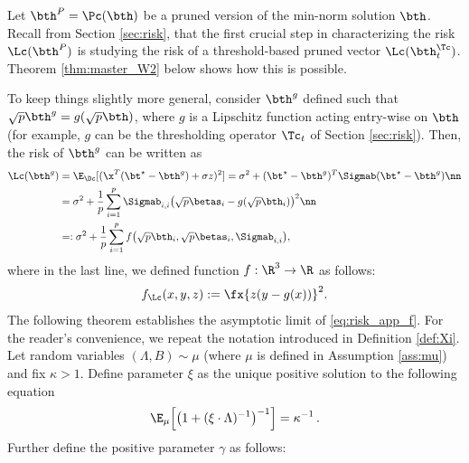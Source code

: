  Let $\bth^P=\Pc(\bth)$ be a pruned version of the min-norm solution $\bth$. Recall from Section \ref{sec:risk}, that the first crucial step in characterizing the risk $\Lc(\bth^P)$ is studying the risk of a threshold-based pruned vector $\Lc(\bth^\Tc_t)$. Theorem \ref{thm:master_W2} below shows how this is possible. 

To keep things slightly more general,  consider $\bth^{g}$ defined such that $\sqrt{p}\bth^{g}=g(\sqrt{p}\bth)$, where $g$ is a Lipschitz function acting entry-wise on $\bth$ (for example, $g$ can be the  thresholding operator $\Tc_t$ of Section \ref{sec:risk}). Then,  the risk of $\bth^g$ can be written as
\begin{align}
\Lc(\bth^g) &= \E_{\Dc}[(\x^T(\bt^\star-\bth^g) + \sigma z)^2] = \sigma^2 + (\bt^\star-\bth^g)^T\Sigmab(\bt^\star-\bth^g) \nn \\
  &= \sigma^2 + \frac{1}{p}\sum_{i=1}^p\Sigmab_{i,i}\big(\sqrt{p}\betas_i-g(\sqrt{p}\bth_i)\big)^2\nn
  \\
    &=: \sigma^2 + \frac{1}{p}\sum_{i=1}^p f\big(\sqrt{p}\bth_i,\sqrt{p}\betas_i,\Sigmab_{i,i}\big),\label{eq:risk_app_f}
\end{align}
where in the last line, we defined function $f:\R^3\rightarrow\R$ as follows:
\begin{align}\label{eq:fdef}
f_\Lc(x,y,z) := \fx{z(y-g(x))}^2.
\end{align}
The following theorem establishes the asymptotic limit of \eqref{eq:risk_app_f}. For the reader's convenience, we repeat the notation introduced in Definition \ref{def:Xi}.
Let random variables $(\Lambda,B)\sim \mu$ (where $\mu$ is defined in Assumption \ref{ass:mu}) and fix $\kappa>1$. Define parameter $\xi$ as the unique positive solution to the following equation
$$
\E_{\mu}\Big[ \big({1+(\xi\cdot\Lambda)^{-1}}\big)^{-1} \Big] = {\kappa^{-1}}\,.
$$
Further define the positive parameter $\gamma$ as follows:
